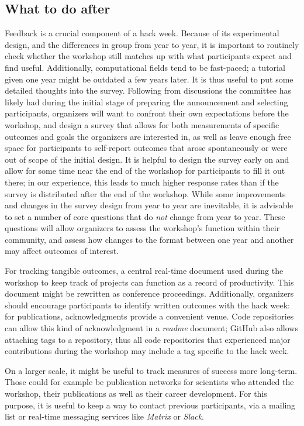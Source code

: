 \documentclass{aastex62}
\begin{document}
\subsection{What to do after}

Feedback is a crucial component of a hack week. Because of its experimental design, and the differences in group from year to year, it is important to routinely check whether the workshop still matches up with what participants expect and find useful. Additionally, computational fields tend to be fast-paced; a tutorial given one year might be outdated a few years later. It is thus useful to put some detailed thoughts into the survey. Following from discussions the committee has likely had during the initial stage of preparing the announcement and selecting participants, organizers will want to confront their own expectations before the workshop, and design a survey that allows for both measurements of specific outcomes and goals the organizers are interested in, as well as leave enough free space for participants to self-report outcomes that arose spontaneously or were out of scope of the initial design. It is helpful to design the survey early on and allow for some time near the end of the workshop for participants to fill it out there; in our experience, this leads to much higher response rates than if the survey is distributed after the end of the workshop. While some improvements and changes in the survey design from year to year are inevitable, it is advisable to set a number of core questions that do \textit{not} change from year to year. These questions will allow organizers to assess the workshop's function within their community, and assess how changes to the format between one year and another may affect outcomes of interest.

For tracking tangible outcomes, a central real-time document used during the workshop to keep track of projects can function as a record of productivity. This document might be rewritten as conference proceedings. Additionally, organizers should encourage participants to identify written outcomes with the hack week: for publications, acknowledgments provide a convenient venue. Code repositories can allow this kind of acknowledgment in a \textit{readme} document; GitHub also allows attaching tags to a repository, thus all code repositories that experienced major contributions during the workshop may include a tag specific to the hack week.

On a larger scale, it might be useful to track measures of success more long-term. Those could for example be publication networks for scientists who attended the workshop, their publications as well as their career development. For this purpose, it is useful to keep a way to contact previous participants, via a mailing list or real-time messaging services like \textit{Matrix} or \textit{Slack}.



\end{document}

